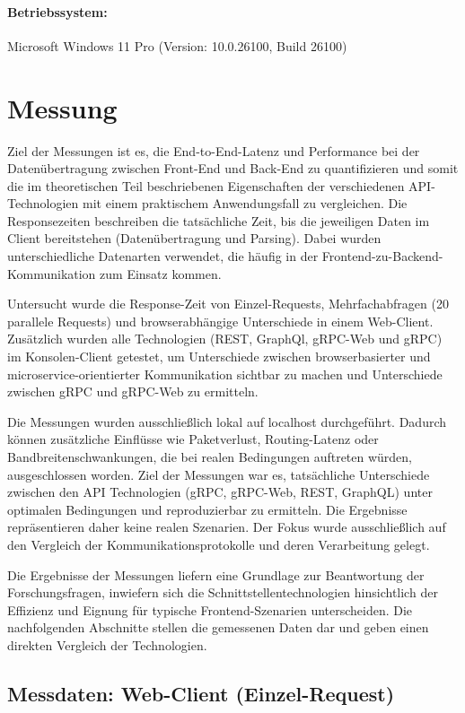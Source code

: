 \paragraph{Betriebssystem:}
Microsoft Windows 11 Pro (Version: 10.0.26100, Build 26100)

\clearpage
\section{Messung}
Ziel der Messungen ist es, die End-to-End-Latenz und Performance bei der Datenübertragung zwischen Front-End und Back-End zu quantifizieren und somit die im theoretischen Teil beschriebenen Eigenschaften der verschiedenen API-Technologien mit einem praktischem Anwendungsfall zu vergleichen.  
Die Responsezeiten beschreiben die tatsächliche Zeit, bis die jeweiligen Daten im Client bereitstehen (Datenübertragung und Parsing). Dabei wurden unterschiedliche Datenarten verwendet, die häufig in der Frontend-zu-Backend-Kommunikation zum Einsatz kommen.  

Untersucht wurde die Response-Zeit von Einzel-Requests, Mehrfachabfragen (20 parallele Requests) und browserabhängige Unterschiede in einem Web-Client. Zusätzlich wurden alle Technologien (REST, GraphQl, gRPC-Web und gRPC) im Konsolen-Client getestet, um Unterschiede zwischen browserbasierter und microservice-orientierter Kommunikation sichtbar zu machen und Unterschiede zwischen gRPC und gRPC-Web zu ermitteln.

Die Messungen wurden ausschließlich lokal auf localhost durchgeführt. Dadurch können zusätzliche Einflüsse wie Paketverlust, Routing-Latenz oder Bandbreitenschwankungen, die bei realen Bedingungen auftreten würden, ausgeschlossen worden. Ziel der Messungen war es, tatsächliche Unterschiede zwischen den API Technologien (gRPC, gRPC-Web, REST, GraphQL) unter optimalen Bedingungen und reproduzierbar zu ermitteln.
Die Ergebnisse repräsentieren daher keine realen Szenarien. Der Fokus wurde ausschließlich auf den Vergleich der Kommunikationsprotokolle und deren Verarbeitung gelegt.

Die Ergebnisse der Messungen liefern eine Grundlage zur Beantwortung der Forschungsfragen, inwiefern sich die Schnittstellentechnologien hinsichtlich der Effizienz und Eignung für typische Frontend-Szenarien unterscheiden.  
Die nachfolgenden Abschnitte stellen die gemessenen Daten dar und geben einen direkten Vergleich der Technologien.

\clearpage
\subsection*{Messdaten: Web-Client (Einzel-Request)}


